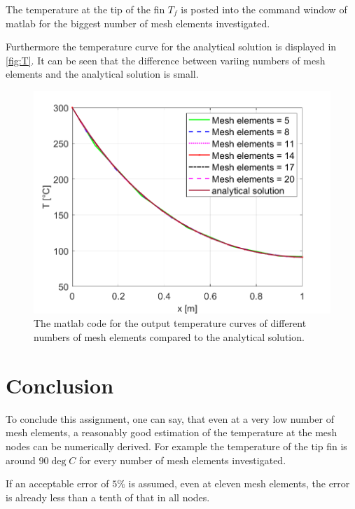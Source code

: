 

The temperature at the tip of the fin $T_f$ is posted into the command window of matlab for the biggest number of mesh elements investigated.

Furthermore the temperature curve for the analytical solution is displayed in \autoref{fig:T}. It can be seen that the difference between variing numbers of mesh elements and the analytical solution is small. 

\begin{figure}[H]
    \centering
    \includegraphics[width=.75\textwidth]{figures/T.png}
    \caption{The matlab code for the output temperature curves of different numbers of mesh elements compared to the analytical solution.}
    \label{fig:T}
\end{figure}


\chapter{Conclusion}


To conclude this assignment, one can say, that even at a very low number of mesh elements, a reasonably good estimation of the temperature at the mesh nodes can be numerically derived. For example the temperature of the tip fin is around $90 \deg C$ for every number of mesh elements investigated.

If an acceptable error of $5 \%$ is assumed, even at eleven mesh elements, the error is already less than a tenth of that in all nodes.


















